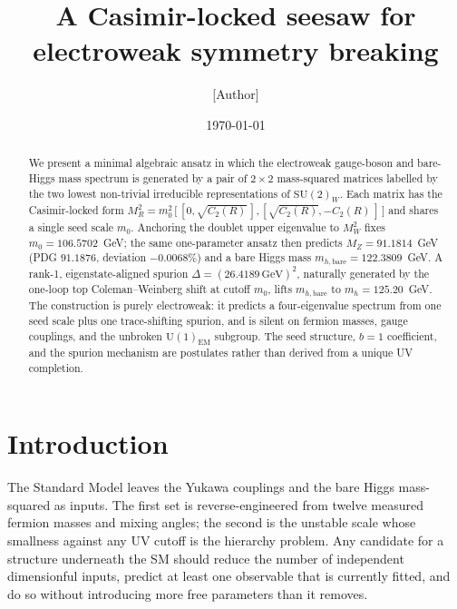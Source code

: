 \documentclass[%
 aps,
 prd,
 reprint,
 nofootinbib,
 superscriptaddress,
 amsmath,
 amssymb,
]{revtex4-2}
\begin{document}
\title{A Casimir-locked seesaw for electroweak symmetry breaking}

\author{[Author]}
\affiliation{[Affiliation]}

\date{\today}

\begin{abstract}
We present a minimal algebraic ansatz in which the electroweak gauge-boson and bare-Higgs mass spectrum is generated by a pair of $2\times 2$ mass-squared matrices labelled by the two lowest non-trivial irreducible representations of $\mathrm{SU}(2)_W$. Each matrix has the Casimir-locked form $M_R^2 = m_0^2\,\bigl[\,[0,\sqrt{C_2(R)}\,],[\sqrt{C_2(R)},-C_2(R)\,]\,\bigr]$ and shares a single seed scale $m_0$. Anchoring the doublet upper eigenvalue to $M_W^2$ fixes $m_0=106.5702$~GeV; the same one-parameter ansatz then predicts $M_Z=91.1814$~GeV (PDG $91.1876$, deviation $-0.0068\%$) and a bare Higgs mass $m_{h,\mathrm{bare}}=122.3809$~GeV. A rank-1, eigenstate-aligned spurion $\Delta=(26.4189\,\mathrm{GeV})^2$, naturally generated by the one-loop top Coleman--Weinberg shift at cutoff $m_0$, lifts $m_{h,\mathrm{bare}}$ to $m_h=125.20$~GeV. The construction is purely electroweak: it predicts a four-eigenvalue spectrum from one seed scale plus one trace-shifting spurion, and is silent on fermion masses, gauge couplings, and the unbroken $\mathrm{U}(1)_{\mathrm{EM}}$ subgroup. The seed structure, $b=1$ coefficient, and the spurion mechanism are postulates rather than derived from a unique UV completion.
\end{abstract}

\maketitle

\section{Introduction}

The Standard Model leaves the Yukawa couplings and the bare Higgs mass-squared as inputs. The first set is reverse-engineered from twelve measured fermion masses and mixing angles; the second is the unstable scale whose smallness against any UV cutoff is the hierarchy problem. Any candidate for a structure underneath the SM should reduce the number of independent dimensionful inputs, predict at least one observable that is currently fitted, and do so without introducing more free parameters than it removes.
\end{document}
